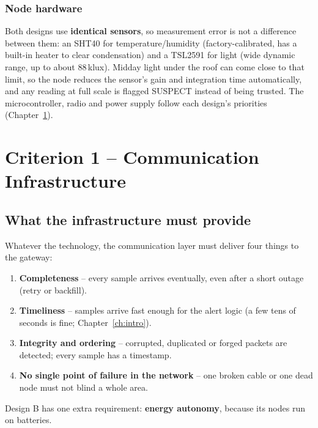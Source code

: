 \documentclass[11pt,a4paper]{report}
\begin{document}
\subsection{Node hardware}
Both designs use \textbf{identical sensors}, so measurement error is not a difference between them: an SHT40 for temperature/humidity (factory-calibrated, has a built-in heater to clear condensation) and a TSL2591 for light (wide dynamic range, up to about 88\,klux). Midday light under the roof can come close to that limit, so the node reduces the sensor's gain and integration time automatically, and any reading at full scale is flagged SUSPECT instead of being trusted. The microcontroller, radio and power supply follow each design's priorities (Chapter~\ref{ch:comm}).

\chapter{Criterion 1 -- Communication Infrastructure}\label{ch:comm}

\section{What the infrastructure must provide}
Whatever the technology, the communication layer must deliver four things to the gateway:
\begin{enumerate}[noitemsep]
  \item \textbf{Completeness} -- every sample arrives eventually, even after a short outage (retry or backfill).
  \item \textbf{Timeliness} -- samples arrive fast enough for the alert logic (a few tens of seconds is fine; Chapter~\ref{ch:intro}).
  \item \textbf{Integrity and ordering} -- corrupted, duplicated or forged packets are detected; every sample has a timestamp.
  \item \textbf{No single point of failure in the network} -- one broken cable or one dead node must not blind a whole area.
\end{enumerate}
Design B has one extra requirement: \textbf{energy autonomy}, because its nodes run on batteries.
\end{document}
